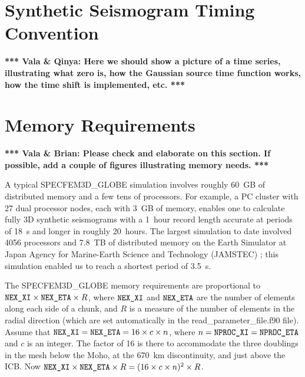 \documentclass[onecolumn]{article}
\newcommand{\tovalabrian}[1]{\textbf{*** Vala \& Brian: #1 ***}}
\newcommand{\tovalaqinya}[1]{\textbf{*** Vala \& Qinya: #1 ***}}
\newcommand{\nexxi}{\mbox{\texttt{NEX\_XI}}}
\newcommand{\nexeta}{\mbox{\texttt{NEX\_ETA}}}
\newcommand{\nprocxi}{\mbox{\texttt{NPROC\_XI}}}
\newcommand{\nproceta}{\mbox{\texttt{NPROC\_ETA}}}
\begin{document}




\appendix

\section{Synthetic Seismogram Timing Convention}

\tovalaqinya{Here we should show a picture of a time series, illustrating what
zero is, how the Gaussian source time function works, how the time
shift is implemented, etc.}

\section{Memory Requirements}
\tovalabrian{Please check and elaborate on this section. If possible, add a couple
of figures illustrating memory needs.}

A typical SPECFEM3D\_GLOBE simulation involves roughly 60~GB of distributed
memory and a few tens of processors. For example,
a PC cluster with 27 dual processor nodes, each with 3~GB of memory,
enables one to calculate fully 3D synthetic seismograms with
a 1~hour record length accurate at periods of 18~s and longer in roughly
20~hours.
The largest simulation to date involved 4056 processors and 7.8~TB
of distributed memory on the Earth Simulator at
Japan Agency for Marine-Earth Science and Technology (JAMSTEC)
\cite{KoTsChTr03,TsKoChTr03}; this simulation enabled us to reach a
shortest period of 3.5~s.

The SPECFEM3D\_GLOBE memory requirements are proportional to
$\nexxi\times \nexeta\times R$,
where $\nexxi$ and $\nexeta$ are the number of elements along each side of a
chunk, and $R$ is a measure of the number of elements in the radial
direction (which are set automatically in the read\_parameter\_file.f90 file).
Assume that $\nexxi=\nexeta=16\times c\times n$,
where $n=\nprocxi=\nproceta$ and $c$ is an integer.
The factor of 16 is there to accommodate the three doublings in the mesh
below the Moho, at the 670~km discontinuity, and just above the ICB.
Now $\nexxi\times \nexeta\times R = (16\times c\times n)^2\times R$.
\end{document}
